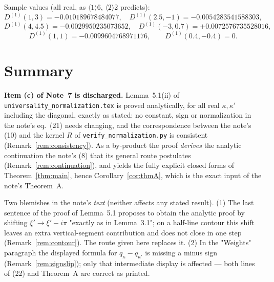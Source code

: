\documentclass[11pt]{article}
\begin{document}
Sample values (all real, as \(\langle1\rangle6\), \(\langle2\rangle2\) predicts):
\[
 D^{(1)}(1,3)=-0.010189678484077,\quad
 D^{(1)}(2.5,-1)=-0.0054283541588303,
\]
\[
 D^{(1)}(4,4.5)=-0.0029950235073652,\quad
 D^{(1)}(-3,0.7)=+0.0072576735528016,
\]
\[
 D^{(1)}(1,1)=-0.0099604768971176,\qquad D^{(1)}(0.4,-0.4)=0 .
\]

\section{Summary}

\begin{verdictok}
\textbf{Item (c) of Note~7 is discharged.}  Lemma~5.1(ii) of
\texttt{universality\_normalization.tex} is proved analytically, for all real \(\kappa,\kappa'\)
including the diagonal, exactly as stated: no constant, sign or normalization in
the note's eq.~(21) needs changing, and the correspondence between the note's (10)
and the kernel \(R\) of \texttt{verify\_normalization.py} is consistent
(Remark~\ref{rem:consistency}).  As a by-product the proof \emph{derives} the analytic continuation
the note's (8) that its general route postulates (Remark~\ref{rem:continuation}), and yields the
fully explicit closed forms of Theorem~\ref{thm:main}, hence Corollary~\ref{cor:thmA}, which is the exact input
of the note's Theorem~A.
\end{verdictok}

\begin{verdictgap}
Two blemishes in the note's \emph{text} (neither affects any stated result).
(1) The last sentence of the proof of Lemma~5.1 proposes to obtain the analytic proof by shifting
\(\xi'\to\xi'-i\pi\) "exactly as in Lemma~3.1"; on a half-line contour this shift leaves an extra
vertical-segment contribution and does not close in one step (Remark~\ref{rem:contour}).  The route
given here replaces it.
(2) In the "Weights" paragraph the displayed formula for \(q_\kappa-q_{\kappa'}\) is missing a minus
sign (Remark~\ref{rem:signslip}); only that intermediate display is affected --- both lines of
(22) and Theorem~A are correct as printed.
\end{verdictgap}
\end{document}
